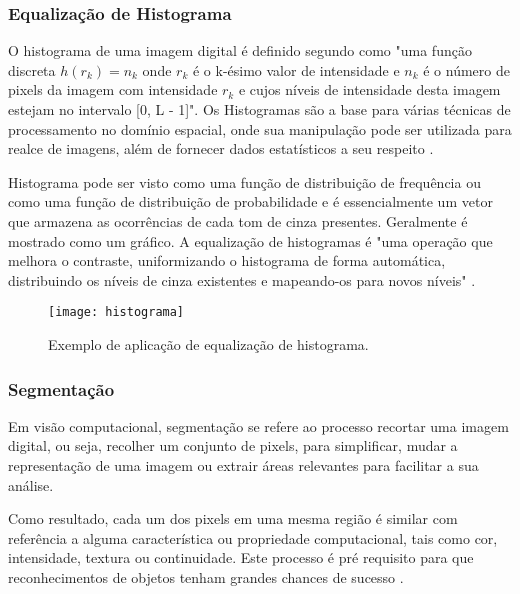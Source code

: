 \subsubsection{Equalização de Histograma}\label{subsubsec:equalizacao}

O histograma de uma imagem digital é definido segundo \cite{gonzalez_woods} como "uma função discreta $h(r_k)=n_k$ onde  $r_k$ é o k-ésimo valor de intensidade e $n_k$  é o número de pixels da imagem com intensidade $r_k$ e cujos níveis de intensidade desta imagem estejam no intervalo [0, L - 1]". Os Histogramas são a base para várias técnicas de processamento no domínio espacial, onde sua manipulação pode ser utilizada para realce de imagens, além de fornecer dados estatísticos a seu respeito \cite{gonzalez_woods}.

Histograma pode ser visto como uma função de distribuição de frequência ou como uma função de distribuição de probabilidade e é essencialmente um vetor que armazena as ocorrências de cada tom de cinza presentes. Geralmente é mostrado como um gráfico. A equalização de histogramas é "uma operação que melhora o contraste, uniformizando o histograma de forma automática, distribuindo os níveis de cinza existentes e mapeando-os para novos níveis" \cite{gabriel_histograma}.

\begin{figure}[h]
	\centering
	\texttt{[image: histograma]}
	\caption{Exemplo de aplicação de equalização de  histograma.}
	\label{fig:histograma}
\end{figure}



\subsubsection{Segmentação}\label{subsubsec:segmentacao}

Em visão computacional, segmentação se refere ao processo recortar uma imagem digital, ou seja, recolher um conjunto de pixels, para simplificar, mudar a representação de uma imagem ou extrair áreas relevantes para facilitar a sua análise. 

Como resultado, cada um dos pixels em uma mesma região é similar com referência a alguma característica ou propriedade computacional, tais como cor, intensidade, textura ou continuidade. Este processo é pré requisito para que reconhecimentos de objetos tenham grandes chances de sucesso \cite{gonzalez_woods}.

